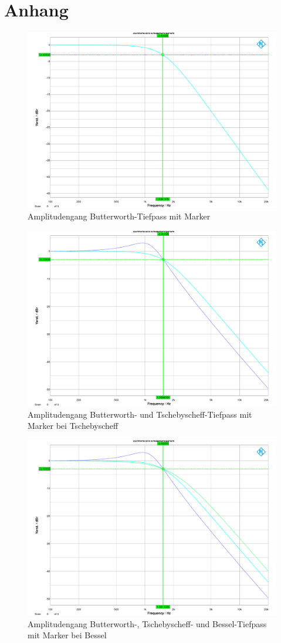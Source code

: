 \section{Anhang}

\begin{figure}[h]
\centering
\includegraphics[width=0.64\linewidth]{Bilder/ImLabor/Amplitudengang_2_1_Butter_TP}
\caption{Amplitudengang Butterworth-Tiefpass mit Marker}
\label{fig:Amplitudengang_2_1_Butter_TP}
\end{figure}

\begin{figure}[h]
\centering
\includegraphics[width=0.65\linewidth]{Bilder/ImLabor/Amplitudengang_2_2_Tscheby_TP}
\caption{Amplitudengang Butterworth- und Tschebyscheff-Tiefpass mit Marker bei Tschebyscheff}
\label{fig:Amplitudengang_2_2_Tscheby_TP}
\end{figure}

\begin{figure}[h]
\centering
\includegraphics[width=0.65\linewidth]{Bilder/ImLabor/Amplitudengang_2_3_Bessel_TP_Alle}
\caption{Amplitudengang Butterworth-, Tschebyscheff- und Bessel-Tiefpass mit Marker bei Bessel}
\label{fig:Amplitudengang_2_3_Bessel_TP_Alle}
\end{figure}

